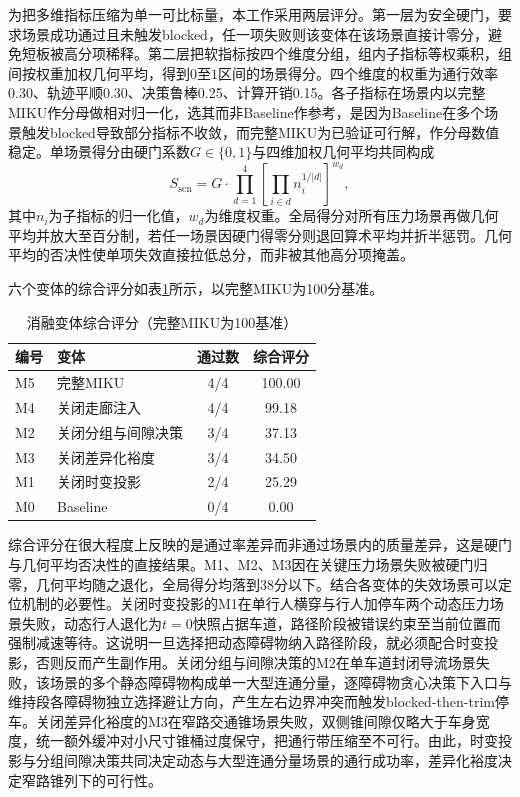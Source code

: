 \documentclass[a4paper,11pt]{ctexart}
\theoremstyle{definition}
\begin{document}
为把多维指标压缩为单一可比标量，本工作采用两层评分。第一层为安全硬门，要求场景成功通过且未触发blocked，任一项失败则该变体在该场景直接计零分，避免短板被高分项稀释。第二层把软指标按四个维度分组，组内子指标等权乘积，组间按权重加权几何平均，得到$0$至$1$区间的场景得分。四个维度的权重为通行效率0.30、轨迹平顺0.30、决策鲁棒0.25、计算开销0.15。各子指标在场景内以完整MIKU作分母做相对归一化，选其而非Baseline作参考，是因为Baseline在多个场景触发blocked导致部分指标不收敛，而完整MIKU为已验证可行解，作分母数值稳定。单场景得分由硬门系数$G \in \{0, 1\}$与四维加权几何平均共同构成
\begin{equation}
S_{\mathrm{scn}} = G \cdot \prod_{d=1}^{4} \left[ \prod_{i \in d} n_i^{1/|d|} \right]^{w_d},
\label{eq:exp_score_scn}
\end{equation}
其中$n_i$为子指标的归一化值，$w_d$为维度权重。全局得分对所有压力场景再做几何平均并放大至百分制，若任一场景因硬门得零分则退回算术平均并折半惩罚。几何平均的否决性使单项失效直接拉低总分，而非被其他高分项掩盖。

六个变体的综合评分如表\ref{tab:exp_ablation_score}所示，以完整MIKU为100分基准。

\begin{table}[htbp]
\centering
\caption{消融变体综合评分（完整MIKU为100基准）}
\label{tab:exp_ablation_score}
\small
\begin{tabular}{llcc}
\toprule
\textbf{编号} & \textbf{变体} & \textbf{通过数} & \textbf{综合评分} \\
\midrule
M5 & 完整MIKU             & 4/4 & 100.00 \\
M4 & 关闭走廊注入         & 4/4 & 99.18 \\
M2 & 关闭分组与间隙决策   & 3/4 & 37.13 \\
M3 & 关闭差异化裕度       & 3/4 & 34.50 \\
M1 & 关闭时变投影         & 2/4 & 25.29 \\
M0 & Baseline             & 0/4 & 0.00 \\
\bottomrule
\end{tabular}
\end{table}

综合评分在很大程度上反映的是通过率差异而非通过场景内的质量差异，这是硬门与几何平均否决性的直接结果。M1、M2、M3因在关键压力场景失败被硬门归零，几何平均随之退化，全局得分均落到38分以下。结合各变体的失效场景可以定位机制的必要性。关闭时变投影的M1在单行人横穿与行人加停车两个动态压力场景失败，动态行人退化为$t=0$快照占据车道，路径阶段被错误约束至当前位置而强制减速等待。这说明一旦选择把动态障碍物纳入路径阶段，就必须配合时变投影，否则反而产生副作用。关闭分组与间隙决策的M2在单车道封闭导流场景失败，该场景的多个静态障碍物构成单一大型连通分量，逐障碍物贪心决策下入口与维持段各障碍物独立选择避让方向，产生左右边界冲突而触发blocked-then-trim停车。关闭差异化裕度的M3在窄路交通锥场景失败，双侧锥间隙仅略大于车身宽度，统一额外缓冲对小尺寸锥桶过度保守，把通行带压缩至不可行。由此，时变投影与分组间隙决策共同决定动态与大型连通分量场景的通行成功率，差异化裕度决定窄路锥列下的可行性。
\end{document}
